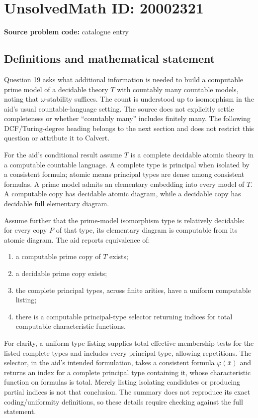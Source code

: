 \documentclass[11pt]{article}
\begin{document}
\section*{UnsolvedMath ID: 20002321}
\textbf{Source problem code:} catalogue entry
\subsection{Definitions and mathematical statement}
Question 19 asks what additional information is needed to build a computable prime model of a decidable theory \(T\) with countably many countable models, noting that \(\omega\)-stability suffices. The count is understood up to isomorphism in the aid's usual countable-language setting. The source does not explicitly settle completeness or whether ``countably many'' includes finitely many. The following DCF/Turing-degree heading belongs to the next section and does not restrict this question or attribute it to Calvert.

For the aid's conditional result assume \(T\) is a complete decidable atomic theory in a computable countable language. A complete type is principal when isolated by a consistent formula; atomic means principal types are dense among consistent formulas. A prime model admits an elementary embedding into every model of \(T\). A computable copy has decidable atomic diagram, while a decidable copy has decidable full elementary diagram.

Assume further that the prime-model isomorphism type is relatively decidable: for every copy \(P\) of that type, its elementary diagram is computable from its atomic diagram. The aid reports equivalence of:
\begin{enumerate}
\item a computable prime copy of \(T\) exists;
\item a decidable prime copy exists;
\item the complete principal types, across finite arities, have a uniform computable listing;
\item there is a computable principal-type selector returning indices for total computable characteristic functions.
\end{enumerate}
For clarity, a uniform type listing supplies total effective membership tests for the listed complete types and includes every principal type, allowing repetitions. The selector, in the aid's intended formulation, takes a consistent formula \(\varphi(\bar x)\) and returns an index for a complete principal type containing it, whose characteristic function on formulas is total. Merely listing isolating candidates or producing partial indices is not that conclusion. The summary does not reproduce its exact coding/uniformity definitions, so these details require checking against the full statement.
\end{document}
